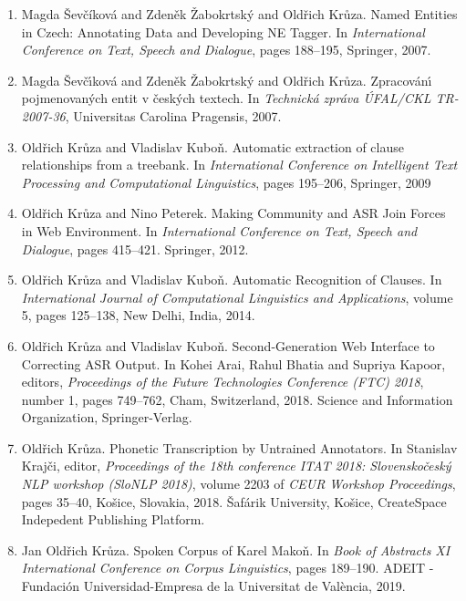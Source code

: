 \documentclass[hidelinks,12pt,a4paper]{report}
\begin{document}
\begin{enumerate}
\item{
  {Magda \v{S}}ev{\v{c}}{\'i}kov{\'a} and Zden{\v{e}}k {\v{Z}}abokrtsk{\'y} and Old{\v{r}}ich Kr{\r{u}}za.
  Named Entities in Czech: Annotating Data and Developing NE Tagger.
  In \textit{International Conference on Text, Speech and Dialogue},
  pages 188--195,
  Springer, 2007.
}
\item{
  Magda {\v{S}}ev{\v{c}}{\'\i}kov{\'a} and Zden{\v{e}}k {\v{Z}}abokrtsk{\'y} and Old{\v{r}}ich Kr\r{u}za.
  Zpracov{\'a}n{\'\i} pojmenovan{\'y}ch entit v {\v{c}}esk{\'y}ch textech.
  In \textit{Technická zpráva ÚFAL/CKL TR-2007-36},
  Universitas Carolina Pragensis, 2007.
}
\item{
  Old{\v{r}}ich Kr\r{u}za and Vladislav Kubo{\v{n}}.
  Automatic extraction of clause relationships from a treebank.
  In \textit{International Conference on Intelligent Text Processing and Computational Linguistics},
  pages 195--206,
  Springer, 2009
}
\item{
  Oldřich Krůza and Nino Peterek.
  Making Community and ASR Join Forces in Web Environment.
  In \textit{International Conference on Text, Speech and Dialogue},
  pages 415--421.
  Springer, 2012.
}
\item{
  Old{\v{r}}ich Kr{\r{u}}za and Vladislav Kubo{\v{n}}.
  Automatic Recognition of Clauses.
  In \textit{International Journal of Computational Linguistics and Applications},
  volume 5,
  pages 125--138,
  New Delhi, India, 2014.
}
\item{
  Oldřich Krůza and Vladislav Kuboň.
  Second-Generation Web Interface to Correcting ASR Output.
  In Kohei Arai, Rahul Bhatia and Supriya Kapoor, editors,
  \textit{Proceedings of the Future Technologies Conference (FTC) 2018},
  number 1, pages 749--762, Cham, Switzerland, 2018.
  Science and Information Organization, Springer-Verlag.
}
\item{
  Oldřich Krůza.
  Phonetic Transcription by Untrained Annotators.
  In Stani\-slav Krajči, editor,
  \textit{Proceedings of the 18th conference ITAT 2018:
  Slovenskočeský NLP workshop (SloNLP 2018)},
  volume 2203 of \textit{CEUR Workshop Proceedings},
  pages 35--40,
  Košice, Slovakia, 2018.
  Šafárik University, Košice,
  CreateSpace Indepedent Publishing Platform.
}
\item{
  Jan Oldřich Krůza.
  Spoken Corpus of Karel Makoň.  
  In \textit{Book of Abstracts XI International Conference on Corpus Linguistics},
  pages 189--190.
  ADEIT - Fundación Universidad-Empresa de la Universitat de València, 2019.\\
}
\end{enumerate}
\end{document}
